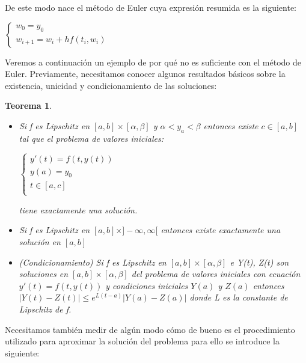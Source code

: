 \documentclass{article}
\theoremstyle{theorem-style}  %
\newtheorem{theorem}{Teorema}[section]  %
\theoremstyle{definition}
\theoremstyle{example-style}
\begin{document}
De este modo nace el método de Euler cuya expresión resumida es la siguiente:

\begin{center}
$\begin{cases}
w_0=y_0 \\
w_{i+1} = w_i + h f(t_i,w_i)
\end{cases}$
\end{center}

Veremos a continuación un ejemplo de por qué no es suficiente con el método de Euler. Previamente, necesitamos conocer algunos resultados básicos sobre la existencia, unicidad y condicionamiento de las soluciones:

\begin{theorem}
\begin{itemize}
\item Si f es Lipschitz en $[a,b]\times[\alpha,\beta]$ y $\alpha < y_a < \beta$ entonces existe $c \in [a,b]$ tal que el problema de valores iniciales:
\begin{center}
$\begin{cases}
y'(t) = f(t,y(t)) \\
y(a) = y_0 \\
t \in [a,c] \\
\end{cases}$
\end{center}
tiene exactamente una solución. 
\item Si f es Lipschitz en $[a,b]\times]-\infty,\infty[$ entonces existe exactamente una solución en $[a,b]$
\item (Condicionamiento) Si f es Lipschitz en $[a,b]\times[\alpha,\beta]$ e Y(t), Z(t) son soluciones en $[a,b]\times[\alpha,\beta]$ del problema de valores iniciales con ecuación $y'(t) = f(t,y(t))$ y condiciones iniciales $Y(a)$ y $Z(a)$ entonces $|Y(t)-Z(t)| \leq e^{L(t-a)}|Y(a)-Z(a)|$ donde L es la constante de Lipschitz de f.
\end{itemize}
\end{theorem}

Necesitamos también medir de algún modo cómo de bueno es el procedimiento utilizado para aproximar la solución del problema para ello se introduce la siguiente:
\end{document}
